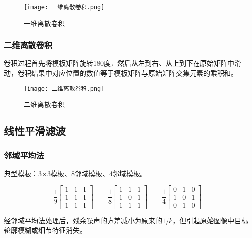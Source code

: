 \documentclass[cn, blue, normal, 12pt]{elegantnote}
\begin{document}
{\begin{figure}[htbp]
    \centering
    \texttt{[image: 一维离散卷积.png]}
    \caption{一维离散卷积}
\end{figure}

\subsubsection{二维离散卷积}

卷积过程首先将模板矩阵旋转180度，然后从左到右、从上到下在原始矩阵中滑动，卷积结果中对应位置的数值等于模板矩阵与原始矩阵交集元素的乘积和。

\begin{figure}[htbp]
    \centering
    \texttt{[image: 二维离散卷积.png]}
    \caption{二维离散卷积}
\end{figure}

\subsection{线性平滑滤波}

\subsubsection{邻域平均法}

典型模板：3$\times$3模板、8邻域模板、4邻域模板。

\begin{equation}
    \frac{1}{9}\left[
        \begin{array}{ccc}
            1 & 1 & 1 \\
            1 & 1 & 1 \\
            1 & 1 & 1
        \end{array}
    \right]\quad\quad
    \frac{1}{8}\left[
        \begin{array}{ccc}
            1 & 1 & 1 \\
            1 & 0 & 1 \\
            1 & 1 & 1
        \end{array}
    \right]\quad\quad
    \frac{1}{4}\left[
        \begin{array}{ccc}
            0 & 1 & 0 \\
            1 & 0 & 1 \\
            0 & 1 & 0
        \end{array}
    \right]
\end{equation}

经邻域平均法处理后，残余噪声的方差减小为原来的$1/k$，但引起原始图像中目标轮廓模糊或细节特征消失。

}
\end{document}
